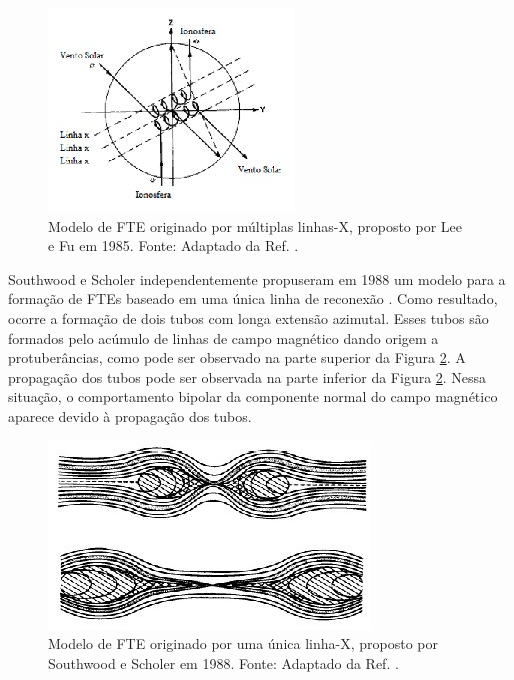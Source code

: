 \begin{figure}
	\begin{center}
		\includegraphics[scale=0.8]{leeefu.jpg}
		\caption{ Modelo de FTE originado por múltiplas linhas-X, proposto por Lee e Fu em 1985. Fonte: Adaptado da Ref. \cite{lee1985}. }
		\label{leeefu}
	\end{center}
\end{figure}

Southwood e Scholer independentemente propuseram em 1988 um modelo para a formação de FTEs baseado em uma única linha de reconexão \cite{southwood1988,scholer1988}. Como resultado, ocorre a formação de dois tubos com longa extensão azimutal. Esses tubos são formados pelo acúmulo de linhas de campo magnético dando origem a protuberâncias, como pode ser observado na parte superior da Figura \ref{southwood2}. A propagação dos tubos pode ser observada na parte inferior da Figura \ref{southwood2}. Nessa situação, o comportamento bipolar da componente normal do campo magnético aparece devido à propagação dos tubos. 

\begin{figure}
	\begin{center}
		\includegraphics[scale=0.7]{southwood2.jpg}
		\caption{Modelo de FTE originado por uma única linha-X, proposto por Southwood e Scholer em 1988. Fonte: Adaptado da Ref. \cite{southwood1988}. }
		\label{southwood2}
	\end{center}
\end{figure}

